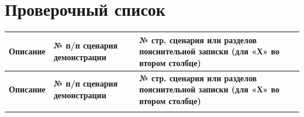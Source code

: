 \documentclass[a4paper,12pt]{article}
\begin{document}
\section{Проверочный список}
\begin{longtable}{|p{7cm}|p{3cm}|p{3cm}|}
    \hline
    \textbf{Описание}                                                                                     & \textbf{№ п/п сценария демонстрации} & \textbf{№ стр. сценария или разделов пояснительной записки (для «Х» во втором столбце)} \\
    \hline
    \endfirsthead %
    \hline
    \textbf{Описание}                                                                                     & \textbf{№ п/п сценария демонстрации} & \textbf{№ стр. сценария или разделов пояснительной записки (для «Х» во втором столбце)} \\
    \hline
    \endhead %
    \hline
    \endfoot %
    \hline
    \endlastfoot %


\end{longtable}
\end{document}
